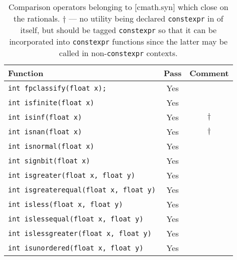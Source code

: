 \documentclass[prd,twocolumn,amsmath,amssymb,nofootinbib,eqsecnum]{revtex4-1}
\newcommand{\constexpr}{\code{constexpr}\xspace}
\newcommand{\code}[1]{{\tt #1}}
\begin{document}
\begin{table}[h]
	\begin{tabular}{lcc}
		Function & Pass & Comment
	\\
	\hline \hline
		\code{int fpclassify(float x);} & Yes &
	\\
	\hline
		\code{int isfinite(float x)} & Yes &
	\\
	\hline
		\code{int isinf(float x)} & Yes & $\dagger$
	\\
	\hline
		\code{int isnan(float x)} & Yes & $\dagger$ 
	\\
	\hline
		\code{int isnormal(float x)} & Yes &
	\\
	\hline
		\code{int signbit(float x)} & Yes &
	\\
	\hline
		\code{int isgreater(float x, float y)} & Yes &
	\\
	\hline
		\code{int isgreaterequal(float x, float y)} & Yes &
	\\
	\hline
		\code{int isless(float x, float y)} & Yes &
	\\
	\hline
		\code{int islessequal(float x, float y)} & Yes &
	\\
	\hline
		\code{int islessgreater(float x, float y)} & Yes &
	\\
	\hline
		\code{int isunordered(float x, float y)} & Yes &
	\end{tabular}
\caption{Comparison operators belonging to [cmath.syn] which close on the rationals. $\dagger$ --- no utility being declared \constexpr in of itself, but should be tagged \constexpr so that it can be incorporated into \constexpr functions since the latter may be called in  non-\constexpr contexts.}
\label{tab:26.9.4}
\end{table}
\end{document}
